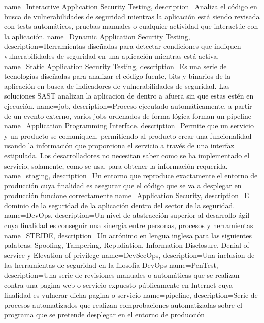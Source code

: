 {
        name=Interactive Application Security Testing,
        description={Analiza el código en busca de vulnerabilidades de seguridad
        mientras la aplicación está siendo revisada con tests automáticos,
        pruebas manuales o cualquier actividad que interactúe con la aplicación.}
}
{
        name=Dynamic Application Security Testing,
        description={Herramientas diseñadas para detectar condiciones que
        indiquen vulnerabilidades de seguridad en una aplicación mientras está
        activa.}
}
{
        name=Static Application Security Testing,
        description={Es una serie de tecnologías diseñadas para analizar el
        código fuente, bits y binarios de la aplicación en busca de indicadores
        de vulnerabilidades de seguridad. Las soluciones SAST analizan la
        aplicacion de dentro a afuera sin que estas estén en ejecución.  }
}
{
        name=job,
        description={Proceso ejecutado automáticamente, a partir de un evento externo, varios jobs ordenados de forma lógica forman un pipeline}
}
{
        name=Application Programming Interface, description={Permite que un
        servicio y un producto se comuniquen, permitiendo al producto crear una
        funcionalidad usando la información que proporciona el servicio a través
        de una interfaz estipulada.  Los desarrolladores no necesitan saber como
        se ha implementado el servicio, solamente, como se usa, para obtener la
        información requerida.}
}
{
        name=staging,
        description={Un entorno que reproduce exactamente el entorno de producción cuya finalidad es asegurar que el código que se va a desplegar en producción funcione correctamente}
}
{
        name=Application Security,
        description={El dominio de la seguridad de la aplicación dentro del 
        sector de la seguridad.}
}
{
        name=DevOps,
        description={Un nivel de abstracción superior al desarrollo ágil cuya
        finalidad es conseguir una sinergia entre personas, procesos y
        herramientas}
}
{
        name=STRIDE,
        description={Un acrónimo en lengua inglesa para las siguientes palabras:
        Spoofing, Tampering, Repudiation, Information Disclosure, Denial of
        service y Elevation of privilege}
}
{
        name=DevSecOps,
        description={Una inclusion de las herramientas de seguridad en la
        filosofía DevOps}
}
{
        name=PenTest,
        description={Una serie de revisiones manuales o automáticas que se
        realizan contra una pagina web o servicio expuesto públicamente en
        Internet cuya
        finalidad es vulnerar dicha pagina o servicio}
}
{
        name=pipeline,
        description={Serie de procesos automatizados que realizan comprobaciones automatizadas sobre el programa que se pretende desplegar en el entorno de producción}
}

